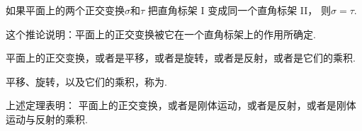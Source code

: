 \begin{corollary}
如果平面上的两个正交变换\(\sigma\)和\(\tau\)
把直角标架 I 变成同一个直角标架 II，
则\(\sigma = \tau\).
\end{corollary}
\begin{remark}
这个推论说明：平面上的正交变换被它在一个直角标架上的作用所确定.
\end{remark}

\begin{theorem}
平面上的正交变换，或者是平移，或者是旋转，或者是反射，或者是它们的乘积.
\end{theorem}

平移、旋转，以及它们的乘积，称为.

上述定理表明：
平面上的正交变换，或者是刚体运动，或者是反射，或者是刚体运动与反射的乘积.

